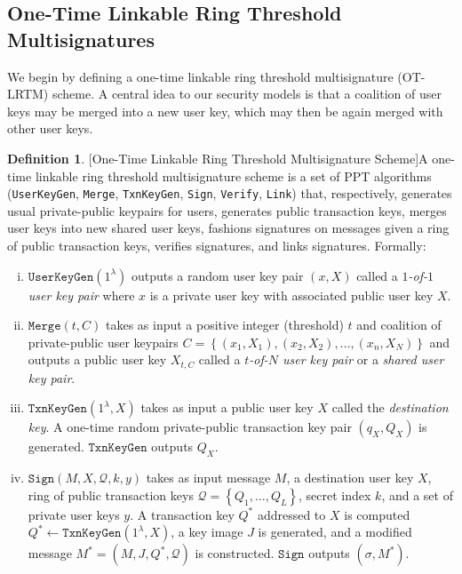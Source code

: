 \documentclass{mrl}
\theoremstyle{definition}
\newtheorem{defn}[theorem]{Definition}
\begin{document}
\subsection{One-Time Linkable Ring Threshold Multisignatures}\label{sec:otlrtm}

We begin by defining a one-time linkable ring threshold multisignature (OT-LRTM) scheme. A central idea to our security models is that a coalition of user keys may be merged into a new user key, which may then be again merged with other user keys. 


\begin{defn}{[One-Time Linkable Ring Threshold Multisignature Scheme]}\label{OT-LRTM} A one-time linkable ring threshold multisignature scheme is a set of PPT algorithms (\texttt{UserKeyGen}, \texttt{Merge}, \texttt{TxnKeyGen},  \texttt{Sign}, \texttt{Verify}, \texttt{Link}) that, respectively, generates usual private-public keypairs for users, generates public transaction keys, merges user keys into new shared user keys, fashions signatures on messages given a ring of public transaction keys, verifies signatures, and links signatures. Formally:
\begin{enumerate}[(i)]
    \item $\texttt{UserKeyGen}(1^\lambda)$ outputs a random user key pair $(x,X)$ called a \textit{$1$-of-$1$ user key pair} where $x$ is a private user key with associated public user key $X$.
    
    \item $\texttt{Merge}(t,C)$ takes as input a positive integer (threshold) $t$ and coalition of private-public user keypairs $C=\left\{(x_1,X_1), (x_2,X_2), \ldots, (x_n,X_N)\right\}$ and outputs a public user key $X_{t,C}$ called a \textit{$t$-of-$N$ user key pair} or a \textit{shared user key pair}.
    
    \item $\texttt{TxnKeyGen}(1^\lambda, X)$ takes as input a public user key $X$ called the \textit{destination key}. A one-time random private-public transaction key pair $(q_X,Q_X)$ is generated. $\texttt{TxnKeyGen}$ outputs $Q_X$.
    
    
    \item $\texttt{Sign}(M,X,\mathcal{Q},k, y)$ takes as input message $M$, a destination user key $X$, ring of public transaction keys $\mathcal{Q}=\left\{Q_1, \ldots, Q_L\right\}$, secret index $k$, and a set of private user keys $y$. A transaction key $Q^*$ addressed to $X$ is computed $Q^* \leftarrow \texttt{TxnKeyGen}(1^\lambda, X)$, a key image $J$ is generated, and a modified message $M^*=(M, J, Q^*, \mathcal{Q})$ is constructed. $\texttt{Sign}$ outputs $(\sigma, M^*)$.
    

\end{enumerate}
\end{defn}
\end{document}
